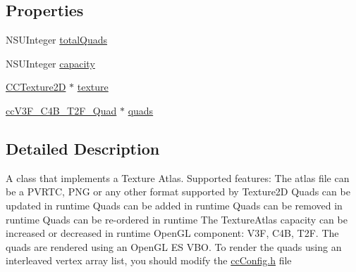 \subsection*{Properties}
\begin{DoxyCompactItemize}
\item 
N\-S\-U\-Integer \hyperlink{interface_c_c_texture_atlas_a1fcff61e63514529e3d1c02b43503d9f}{total\-Quads}
\item 
N\-S\-U\-Integer \hyperlink{interface_c_c_texture_atlas_a1dcb01c13da3675d0526a4c40ee9b950}{capacity}
\item 
\hyperlink{class_c_c_texture2_d}{C\-C\-Texture2\-D} $\ast$ \hyperlink{interface_c_c_texture_atlas_a2d6d32bd902b92d0d490bf334b44a043}{texture}
\item 
\hyperlink{cc_types_8h_ab2642984bbb3d2fa1fe4fedb5657a065}{cc\-V3\-F\-\_\-\-C4\-B\-\_\-\-T2\-F\-\_\-\-Quad} $\ast$ \hyperlink{interface_c_c_texture_atlas_a7709f63e3948650e00aa884aaa445536}{quads}
\end{DoxyCompactItemize}


\subsection{Detailed Description}
A class that implements a Texture Atlas. Supported features\-: The atlas file can be a P\-V\-R\-T\-C, P\-N\-G or any other format supported by Texture2\-D Quads can be updated in runtime Quads can be added in runtime Quads can be removed in runtime Quads can be re-\/ordered in runtime The Texture\-Atlas capacity can be increased or decreased in runtime Open\-G\-L component\-: V3\-F, C4\-B, T2\-F. The quads are rendered using an Open\-G\-L E\-S V\-B\-O. To render the quads using an interleaved vertex array list, you should modify the \hyperlink{cc_config_8h}{cc\-Config.\-h} file 


